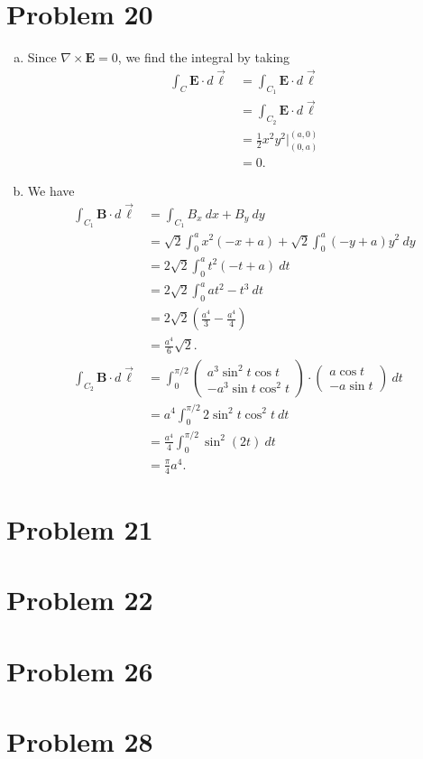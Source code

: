 \documentclass[10pt]{mypackage}
\begin{document}
\section{Problem 20}%
\begin{enumerate}[(a)]
  \item Since $\nabla \times \mathbf{E} = 0$, we find the integral by taking
    \begin{align*}
      \int_{C}^{} \mathbf{E}\cdot d\vec{\ell} &= \int_{C_1}^{} \mathbf{E}\cdot d\vec{\ell}\\
                                              &= \int_{C_2}^{} \mathbf{E}\cdot d\vec{\ell}\\
                                              &= \frac{1}{2}x^2y^2\bigr\vert_{(0,a)}^{(a,0)}\\
                                              &= 0.
    \end{align*}
  \item We have
    \begin{align*}
      \int_{C_1}^{} \mathbf{B}\cdot d\vec{\ell} &= \int_{C_1}^{} B_x\:dx + B_y\:dy\\
                                                &= \sqrt{2}\int_{0}^{a}x^2\left(-x+a\right) + \sqrt{2}\int_{0}^{a} \left(-y + a\right)y^2\:dy\\
                                                &= 2\sqrt{2}\int_{0}^{a} t^2(-t + a)\:dt\\
                                                &= 2\sqrt{2}\int_{0}^{a} at^2 - t^3\:dt\\
                                                &= 2\sqrt{2}\left(\frac{a^4}{3} - \frac{a^4}{4}\right)\\
                                                &= \frac{a^4}{6}\sqrt{2}.\\
      \int_{C_2}^{} \mathbf{B}\cdot d\vec{\ell} &= \int_{0}^{\pi/2} \begin{pmatrix}a^3\sin^2t\cos t \\ -a^3\sin t \cos^2 t\end{pmatrix}\cdot \begin{pmatrix}a \cos t \\ -a\sin t\end{pmatrix}\:dt\\
                                                &= a^4\int_{0}^{\pi/2} 2\sin^2 t \cos ^2 t\:dt\\
                                                &= \frac{a^4}{4}\int_{0}^{\pi/2} \sin^2\left(2t\right)\:dt\\
                                                &= \frac{\pi}{4}a^4.
    \end{align*}
\end{enumerate}
\section{Problem 21}%
\section{Problem 22}%
\section{Problem 26}%
\section{Problem 28}%
\end{document}
